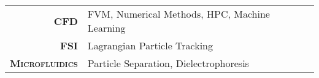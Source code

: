 
\vspace{10pt}

\begin{tabular}{rl}
  \textsc{\textbf{CFD}}           & FVM, Numerical Methods, HPC, Machine Learning \\
  \textsc{\textbf{FSI}}           & Lagrangian Particle Tracking \\
  \textsc{\textbf{Microfluidics}} & Particle Separation, Dielectrophoresis
\end{tabular}
